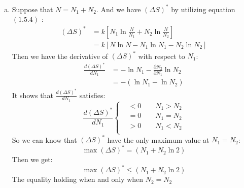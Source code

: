 \documentclass{article}
\begin{document}
\begin{enumerate}[(a)]
        \item   Suppose that $N=N_1+N_2$. And we have $\left(\Delta S \right)^*$ by utilizing equation $(1.5.4)$ :
                \begin{equation}
                \begin{aligned}
                    \left(\Delta S \right)^*&=k\left[N_1 \ln \frac{N}{N_1}+N_2 \ln \frac{N}{N_2} \right]\\
                                            &=k\left[N \ln N- N_1 \ln N_1 -N_2 \ln N_2 \right]
                \end{aligned}
                \end{equation}
                Then we have the derivative of $\left(\Delta S \right)^*$ with respect to $N_1$:
                \begin{equation}
                \begin{aligned}
                    \frac{d \left(\Delta S \right)^*}{d N_1}&=-\ln N_1-\frac{\partial N_2}{\partial N_1}\ln N_2\\
                                                            &=-\left(\ln N_1-\ln N_2\right)
                \end{aligned}
                \end{equation}
                It shows that $\frac{d \left(\Delta S \right)^*}{d N_1}$ satisfies:
                \begin{equation}
                \frac{d \left(\Delta S \right)^*}{d N_1}
                    \left\{
                \begin{aligned}
                    &<0 \qquad  N_1>N_2\\
                    &=0 \qquad  N_1=N_2\\
                    &>0 \qquad  N_1<N_2\\
                \end{aligned}
                    \right.
                \end{equation}
                So we can know that $\left(\Delta S \right)^*$ have the only maximum value at $N_1=N_2$:
                \begin{equation}
                    \max \left(\Delta S \right)^*=\left(N_1+N_2\ln 2\right)
                \end{equation}
                Then we get:
                \begin{equation}
                    \max \left(\Delta S \right)^*\leq\left(N_1+N_2\ln 2\right)
                \end{equation}
                The equality holding when and only when $N_2=N_2$
    \end{enumerate}
\end{document}
